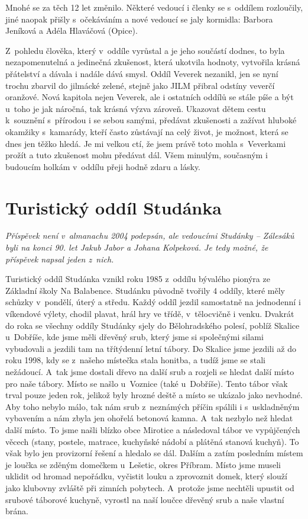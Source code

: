 \documentclass[a5paper, 11pt, twoside]{article}
\begin{document}
Mnohé se za těch 12 let změnilo. Některé vedoucí i členky se s~oddílem
rozloučily, jiné naopak přišly s~očekáváním a nové vedoucí se jaly
kormidla: Barbora Jeníková a Adéla Hlaváčová (Opice).

Z~pohledu člověka, který v~oddíle vyrůstal a je jeho součástí dodnes, to
byla nezapomenutelná a jedinečná zkušenost, která ukotvila hodnoty,
vytvořila krásná přátelství a dávala i nadále dává smysl. Oddíl Veverek
nezanikl, jen se nyní trochu zbarvil do jilmácké zelené, stejně jako
JILM přibral odstíny veverčí oranžové. Nová kapitola nejen Veverek, ale
i ostatních oddílů se stále píše a být u~toho je jak náročná, tak krásná
výzva zároveň. Ukazovat dětem cestu k~souznění s~přírodou i se sebou
samými, předávat zkušenosti a zažívat hluboké okamžiky s~kamarády, kteří
často zůstávají na celý život, je možnost, která se dnes jen těžko
hledá. Je mi velkou ctí, že jsem právě toto mohla s~Veverkami prožít a
tuto zkušenost mohu předávat dál. Všem minulým, současným i budoucím
holkám v~oddílu přeji hodně zdaru a lásky.

\section{Turistický oddíl
Studánka}

\textit{Příspěvek není v~almanachu 2004 podepsán, ale vedoucími Studánky
-- Zálesáků byli na konci 90. let Jakub Jabor a Johana Kolpeková. Je
tedy možné, že příspěvek napsal jeden z~nich.}

Turistický oddíl Studánka vznikl roku 1985 z~oddílu bývalého pionýra ze
Základní školy Na Balabence. Studánku původně tvořily 4 oddíly, které
měly schůzky v~pondělí, úterý a středu. Každý oddíl jezdil samostatně na
jednodenní i víkendové výlety, chodil plavat, hrál hry ve třídě,
v~tělocvičně i venku. Dvakrát do roka se všechny oddíly Studánky sjely do
Bělohradského polesí, poblíž Skalice u~Dobříše, kde jsme měli dřevěný
srub, který jsme si společnými silami vybudovali a jezdili tam na
třítýdenní letní tábory. Do Skalice jsme jezdili až do roku 1998, kdy se
z~našeho místečka stala honitba, a tudíž jsme se stali nežádoucí. A~tak
jsme dostali dřevo na další srub a rozjeli se hledat další místo pro
naše tábory. Místo se našlo u~Voznice (také u~Dobříše). Tento tábor však
trval pouze jeden rok, jelikož byly hrozné deště a místo se ukázalo jako
nevhodné. Aby toho nebylo málo, tak nám srub z~neznámých příčin spálili
i s~uskladněným vybavením a nám zbyla jen ohořelá betonová kamna. A~tak
nezbylo než hledat další místo. To jsme našli blízko obce Mirotice a
následoval tábor ve vypůjčených věcech (stany, postele, matrace,
kuchyňské nádobí a plátěná stanová kuchyň). To však bylo jen provizorní
řešení a hledalo se dál. Dalším a zatím posledním místem je loučka se
zděným domečkem u~Lešetic, okres Příbram. Místo jsme museli uklidit od
hromad nepořádku, vyčistit louku a zprovoznit domek, který slouží jako
klubovny zvláště při zimních pobytech. A~protože jsme nechtěli upustit
od srubové táborové kuchyně, vyrostl na naší loučce dřevěný srub a naše
vlastní brána.
\end{document}

